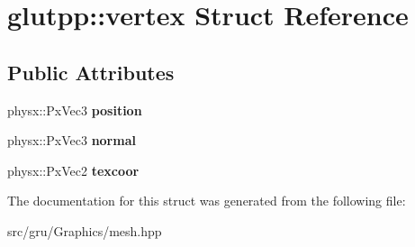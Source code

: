 \hypertarget{structglutpp_1_1vertex}{\section{glutpp\-:\-:vertex \-Struct \-Reference}
\label{structglutpp_1_1vertex}
}
\subsection*{\-Public \-Attributes}
\begin{DoxyCompactItemize}
\item 
\hypertarget{structglutpp_1_1vertex_a971062c72713da6bbef8222ad4314554}{physx\-::\-Px\-Vec3 {\bfseries position}}\label{structglutpp_1_1vertex_a971062c72713da6bbef8222ad4314554}

\item 
\hypertarget{structglutpp_1_1vertex_a26d8be72c99e0f160838812f6dff2632}{physx\-::\-Px\-Vec3 {\bfseries normal}}\label{structglutpp_1_1vertex_a26d8be72c99e0f160838812f6dff2632}

\item 
\hypertarget{structglutpp_1_1vertex_a3379b401d3ef92c6b0238c1c89a090a4}{physx\-::\-Px\-Vec2 {\bfseries texcoor}}\label{structglutpp_1_1vertex_a3379b401d3ef92c6b0238c1c89a090a4}

\end{DoxyCompactItemize}


\-The documentation for this struct was generated from the following file\-:\begin{DoxyCompactItemize}
\item 
src/gru/\-Graphics/mesh.\-hpp\end{DoxyCompactItemize}
